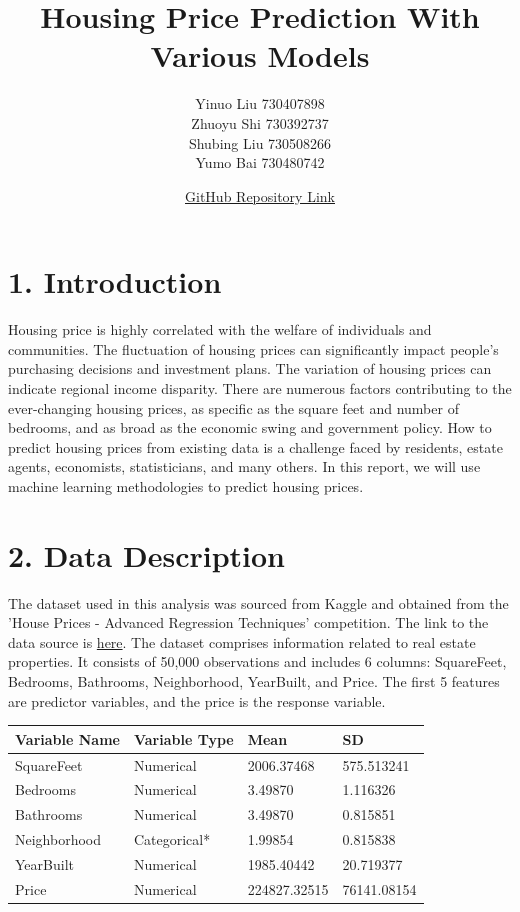 \documentclass[12pt, letterpaper]{report}
\title{\textbf{Housing Price Prediction With Various Models}}
\author{Yinuo Liu 730407898 \\ Zhuoyu Shi 730392737 \\ Shubing Liu 730508266 \\ Yumo Bai 730480742}
\date{\href{https://github.com/YinuoLiu0708/COMP-562-final-project/tree/main}{GitHub Repository Link}}
\begin{document}
\maketitle

\section*{1. Introduction}
Housing price is highly correlated with the welfare of individuals and communities. The fluctuation of housing prices can significantly impact people’s purchasing decisions and investment plans. The variation of housing prices can indicate regional income disparity. There are numerous factors contributing to the ever-changing housing prices, as specific as the square feet and number of bedrooms, and as broad as the economic swing and government policy. How to predict housing prices from existing data is a challenge faced by residents, estate agents, economists, statisticians, and many others. In this report, we will use machine learning methodologies to predict housing prices. 

\section*{2. Data Description}
The dataset used in this analysis was sourced from Kaggle and obtained from the 'House Prices - Advanced Regression Techniques' competition. The link to the data source is \href{https://www.kaggle.com/competitions/house-prices-advanced-regression-techniques/data}{here}. The dataset comprises information related to real estate properties. It consists of 50,000 observations and includes 6 columns: SquareFeet, Bedrooms, Bathrooms, Neighborhood, YearBuilt, and Price. The first 5 features are predictor variables, and the price is the response variable.\vspace{0.75cm}

\begin{tabular}{|p{3cm}||p{3cm}|p{3cm}|p{3cm}|}
\hline
Variable Name &  Variable Type & Mean & SD\\
\hline
SquareFeet & Numerical & 2006.37468 & 575.513241 \\
\hline
Bedrooms & Numerical & 3.49870 & 1.116326 \\
\hline
Bathrooms & Numerical & 3.49870 & 0.815851\\
\hline
Neighborhood & Categorical* & 1.99854 & 0.815838 \\
\hline
YearBuilt & Numerical & 1985.40442 & 20.719377 \\
\hline
Price & Numerical & 224827.32515 &  76141.08154\\
\hline
\end{tabular}
\end{document}

